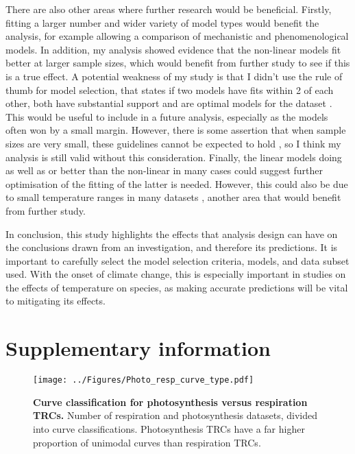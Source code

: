 \documentclass[11pt, a4paper]{article}
\newcommand{\beginsupplement}{
        \setcounter{table}{0}
        \renewcommand{\thetable}{S\arabic{table}}%
        \setcounter{figure}{0}
        \renewcommand{\thefigure}{S\arabic{figure}}%
     }
\begin{document}
There are also other areas where further research would be beneficial. Firstly, fitting a larger number and wider variety of model types would benefit the analysis, for example allowing a comparison of mechanistic and phenomenological models. In addition, my analysis showed evidence that the non-linear models fit better at larger sample sizes, which would benefit from further study to see if this is a true effect. A potential weakness of my study is that I didn't use the rule of thumb for model selection, that states if two models have fits within 2 of each other, both have substantial support and are optimal models for the dataset \cite{johnsonModelSelectionEcology2004, burnhamModelSelectionMultimodel2002}. This would be useful to include in a future analysis, especially as the models often won by a small margin. However, there is some assertion that when sample sizes are very small, these guidelines cannot be expected to hold \cite{burnhamModelSelectionMultimodel2002}, so I think my analysis is still valid without this consideration. Finally, the linear models doing as well as or better than the non-linear in many cases could suggest further optimisation of the fitting of the latter is needed. However, this could also be due to small temperature ranges in many datasets \cite{dellSystematicVariationTemperature2011}, another area that would benefit from further study.

In conclusion, this study highlights the effects that analysis design can have on the conclusions drawn from an investigation, and therefore its predictions. It is important to carefully select the model selection criteria, models, and data subset used. With the onset of climate change, this is especially important in studies on the effects of temperature on species, as making accurate predictions will be vital to mitigating its effects.




\newpage
\section{Supplementary information}

\beginsupplement %

\begin{figure} [H]
	\texttt{[image: ../Figures/Photo\_resp\_curve\_type.pdf]}
	\caption{\label{fig:photo_resp_curve_type} \textbf{Curve classification for photosynthesis versus respiration TRCs.} Number of respiration and photosynthesis datasets, divided into curve classifications. Photosynthesis TRCs have a far higher proportion of unimodal curves than respiration TRCs.}
\end{figure}
\end{document}
